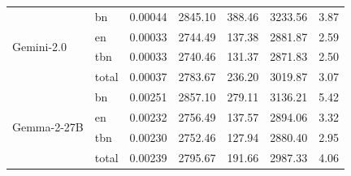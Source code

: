 \documentclass[11pt]{article}
\begin{document}
\begin{table}[h]
{\begin{tabular}{l l l l l l l}
\multirow{4}{*}{Gemini-2.0}     & bn                             & 0.00044           & 2845.10                   & 388.46                    & 3233.56                  & 3.87                       \\
                                & en                             & 0.00033           & 2744.49                   & 137.38                    & 2881.87                  & 2.59                       \\
                                & tbn                            & 0.00033           & 2740.46                   & 131.37                    & 2871.83                  & 2.50                       \\
                                & total                          & 0.00037           & 2783.67                   & 236.20                    & 3019.87                  & 3.07                       \\
\midrule
\multirow{4}{*}{Gemma-2-27B}    & bn                             & 0.00251           & 2857.10                   & 279.11                    & 3136.21                  & 5.42                       \\
                                & en                             & 0.00232           & 2756.49                   & 137.57                    & 2894.06                  & 3.32                       \\
                                & tbn                            & 0.00230           & 2752.46                   & 127.94                    & 2880.40                  & 2.95                       \\
                                & total                          & 0.00239           & 2795.67                   & 191.66                    & 2987.33                  & 4.06                       \\
\midrule


\end{tabular}}
\end{table}
\end{document}
